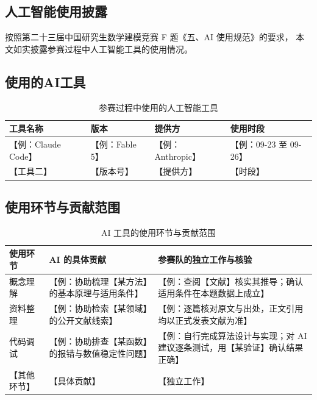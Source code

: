 \documentclass[bwprint]{gmcmthesis}
\numberwithin{equation}{section}
\numberwithin{figure}{section}
\numberwithin{table}{section}
\begin{document}
\begin{appendices}
\section{人工智能使用披露}

按照第二十三届中国研究生数学建模竞赛 F 题《五、AI 使用规范》的要求，
本文如实披露参赛过程中人工智能工具的使用情况。

\subsection{使用的AI工具}

\begin{table}[htp!]
\centering
\renewcommand\arraystretch{1.3}
\begin{tabular*}{\textwidth}{@{\extracolsep{\fill}}llll@{}}
  \toprule
  工具名称 & 版本 & 提供方 & 使用时段 \\
  \midrule
  【例：Claude Code】 & 【例：Fable 5】 & 【例：Anthropic】 & 【例：09-23 至 09-26】 \\
  【工具二】 & 【版本号】 & 【提供方】 & 【时段】 \\
  \bottomrule
\end{tabular*}
\caption{参赛过程中使用的人工智能工具}
\label{tab:ai-tools}
\end{table}



\subsection{使用环节与贡献范围}

\begin{table}[htp!]
\centering
\renewcommand\arraystretch{1.3}
\begin{tabularx}{\textwidth}{lXX}
  \toprule
  使用环节 & AI 的具体贡献 & 参赛队的独立工作与核验 \\
  \midrule
  概念理解 &
  【例：协助梳理【某方法】的基本原理与适用条件】 &
  【例：查阅【文献】核实其推导；确认适用条件在本题数据上成立】 \\
  资料整理 &
  【例：协助检索【某领域】的公开文献线索】 &
  【例：逐篇核对原文与出处，正文引用均以正式发表文献为准】 \\
  代码调试 &
  【例：协助排查【某函数】的报错与数值稳定性问题】 &
  【例：自行完成算法设计与实现；对 AI 建议逐条测试，用【某验证】确认结果正确】 \\
  【其他环节】 & 【具体贡献】 & 【独立工作】 \\
  \bottomrule
\end{tabularx}
\caption{AI 工具的使用环节与贡献范围}
\label{tab:ai-usage}
\end{table}



\end{appendices}
\end{document}
